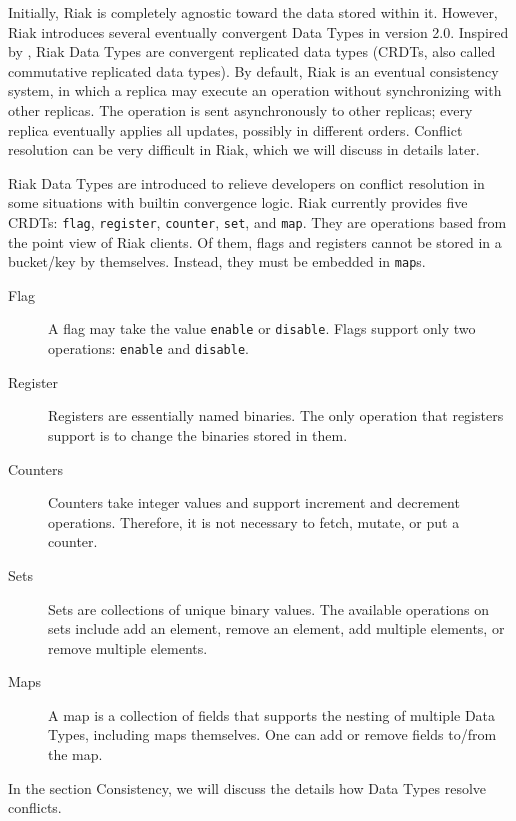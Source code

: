 \documentclass[11pt]{book}
\begin{document}
Initially, Riak is completely agnostic toward the data stored within it. However, Riak introduces several eventually convergent Data Types in version 2.0. Inspired by \cite{CRDT2011}, Riak Data Types are convergent replicated data types (CRDTs, also called commutative replicated data types). By default, Riak is an eventual consistency system, in which a replica may execute an operation without synchronizing with other replicas. The operation is sent asynchronously to other replicas; every replica eventually applies all updates, possibly in different orders. Conflict resolution can be very difficult in Riak, which we will discuss in details later.

Riak Data Types are introduced to relieve developers on conflict resolution in some situations with builtin convergence logic. Riak currently provides five CRDTs: \texttt{flag}, \texttt{register}, \texttt{counter}, \texttt{set}, and \texttt{map}. They are operations based from the point view of Riak clients. Of them, flags and registers cannot be stored in a bucket/key by themselves. Instead, they must be embedded in \texttt{map}s.

\begin{description}
\item[Flag]
A flag may take the value \texttt{enable} or \texttt{disable}.
Flags support only two operations: \texttt{enable} and \texttt{disable}.

\item[Register]
Registers are essentially named binaries.
The only operation that registers support is to change the binaries stored in them.

\item[Counters]
Counters take integer values and support increment and decrement operations. Therefore, it is not necessary to fetch, mutate, or put a counter.

\item[Sets]
Sets are collections of unique binary values.
The available operations on sets include add an element, remove an element, add multiple elements, or remove multiple elements.

\item[Maps]
A map is a collection of fields that supports the nesting of multiple Data Types, including maps themselves. One can add or remove fields to/from the map.
\end{description}

In the section Consistency, we will discuss the details how Data Types resolve conflicts.
\end{document}
